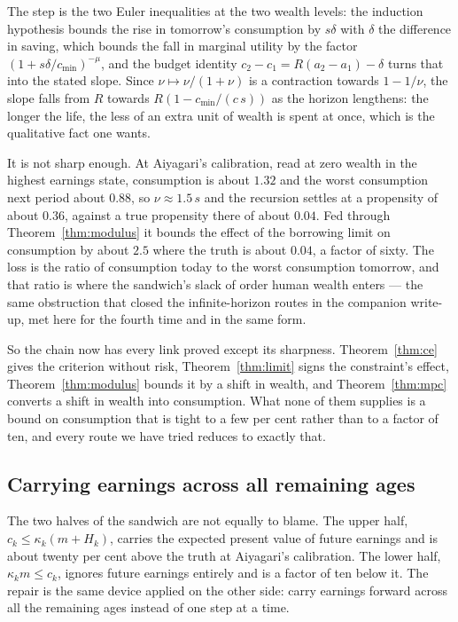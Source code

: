 The step is the two Euler inequalities at the two wealth levels: the induction hypothesis bounds
the rise in tomorrow's consumption by $s\delta$ with $\delta$ the difference in saving, which
bounds the fall in marginal utility by the factor $(1+s\delta/c_{\min})^{-\mu}$, and the budget
identity $c_2-c_1=R(a_2-a_1)-\delta$ turns that into the stated slope. Since $\nu\mapsto\nu/(1+\nu)$
is a contraction towards $1-1/\nu$, the slope falls from $R$ towards $R(1-c_{\min}/(c\,s))$ as the
horizon lengthens: the longer the life, the less of an extra unit of wealth is spent at once,
which is the qualitative fact one wants.

It is not sharp enough. At Aiyagari's calibration, read at zero wealth in the highest earnings
state, consumption is about $1.32$ and the worst consumption next period about $0.88$, so
$\nu\approx1.5\,s$ and the recursion settles at a propensity of about $0.36$, against a true
propensity there of about $0.04$. Fed through Theorem~\ref{thm:modulus} it bounds the effect of
the borrowing limit on consumption by about $2.5$ where the truth is about $0.04$, a factor of
sixty. The loss is the ratio of consumption today to the worst consumption tomorrow, and that
ratio is where the sandwich's slack of order human wealth enters --- the same obstruction that
closed the infinite-horizon routes in the companion write-up, met here for the fourth time and in
the same form.

So the chain now has every link proved except its sharpness. Theorem~\ref{thm:ce} gives the
criterion without risk, Theorem~\ref{thm:limit} signs the constraint's effect,
Theorem~\ref{thm:modulus} bounds it by a shift in wealth, and Theorem~\ref{thm:mpc} converts a
shift in wealth into consumption. What none of them supplies is a bound on consumption that is
tight to a few per cent rather than to a factor of ten, and every route we have tried reduces to
exactly that.

\subsection{Carrying earnings across all remaining ages}

The two halves of the sandwich are not equally to blame. The upper half,
$c_k\le\kappa_k(m+H_k)$, carries the expected present value of future earnings and is about twenty
per cent above the truth at Aiyagari's calibration. The lower half, $\kappa_k m\le c_k$, ignores
future earnings entirely and is a factor of ten below it. The repair is the same device applied on
the other side: carry earnings forward across all the remaining ages instead of one step at a
time.

